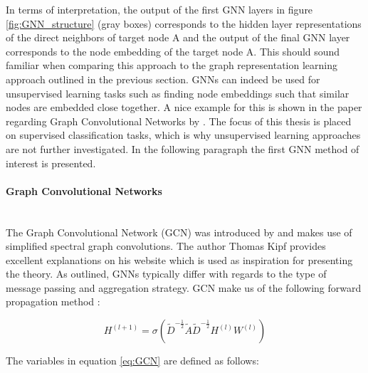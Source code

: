 	\noindent In terms of interpretation, the output of the first GNN layers in
	figure \ref{fig:GNN_structure} (gray boxes) corresponds to the hidden layer 
	representations of the direct neighbors of target node A and the output of 
	the final GNN layer corresponds to the node embedding of the target node A. 
	This should sound familiar when comparing this approach to the graph 
	representation learning approach outlined in the previous section. 
	GNNs can indeed be used for unsupervised learning tasks such as finding node 
	embeddings such that similar nodes are embedded close together. A nice
	example for this is shown in the paper regarding Graph Convolutional
	Networks by \cite[p. 11-12]{kipf2016semi}. The focus of this thesis is
	placed on supervised classification tasks, which is why unsupervised
	learning approaches are not further investigated. In the following paragraph 
	the first GNN method of interest is presented. 


	\paragraph{Graph Convolutional Networks}\mbox{}\\
	
	\noindent The Graph Convolutional Network (GCN) was introduced by 
	\cite{kipf2016semi} and makes use of simplified spectral graph
	convolutions. The author Thomas Kipf \citeyearpar{kipf2016online} provides 
	excellent explanations on his website which is used as inspiration for
	presenting the theory. As outlined, GNNs typically differ with regards to
	the type of message passing and aggregation strategy. GCN make us of the
	following forward propagation method \citep[p. 2]{kipf2016semi}:

	\begin{equation}
		H^{(l+1)} = \sigma\left(\tilde D^{-\frac{1}{2}}\tilde A \tilde
		D^{-\frac{1}{2}}H^{(l)}W^{(l)}\right)
		\label{eq:GCN}
	\end{equation}
	
	\noindent The variables in equation \ref{eq:GCN} are defined as follows:

